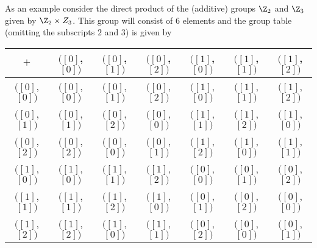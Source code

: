 As an example consider the direct product of the (additive) groups $\Z_{2}$ and $\Z_{3}$ 
given by $\Z_{2} \times Z_{3}$. This group will consist of $6$ elements and the group table
(omitting the subscripts $2$ and $3$) is given
by

\begin{tabular}{ccccccc}
\toprule
$+$    & $(\left[0\right]$,$\left[0\right])$ & $(\left[0\right]$,$\left[1\right])$ 
& $(\left[0\right]$,$\left[2\right])$ & $(\left[1\right]$,$\left[0\right])$
& $(\left[1\right]$,$\left[1\right])$ & $(\left[1\right]$,$\left[2\right])$\\
\midrule
$(\left[0\right]$,$\left[0\right])$   & $(\left[0\right]$,$\left[0\right])$   
& $(\left[0\right]$,$\left[1\right])$ & $(\left[0\right]$,$\left[2\right])$  
& $(\left[1\right]$,$\left[0\right])$
& $(\left[1\right]$,$\left[1\right])$ & $(\left[1\right]$,$\left[2\right])$ \\

$(\left[0\right]$,$\left[1\right])$   & $(\left[0\right]$,$\left[1\right])$   
& $(\left[0\right]$,$\left[2\right])$ & $(\left[0\right]$,$\left[0\right])$  
& $(\left[1\right]$,$\left[1\right])$
& $(\left[1\right]$,$\left[2\right])$ & $(\left[1\right]$,$\left[0\right])$ \\

$(\left[0\right]$,$\left[2\right])$   & $(\left[0\right]$,$\left[2\right])$   
& $(\left[0\right]$,$\left[0\right])$ & $(\left[0\right]$,$\left[1\right])$  
& $(\left[1\right]$,$\left[2\right])$
& $(\left[1\right]$,$\left[0\right])$ & $(\left[1\right]$,$\left[1\right])$ \\

$(\left[1\right]$,$\left[0\right])$   & $(\left[1\right]$,$\left[0\right])$   
& $(\left[1\right]$,$\left[1\right])$ & $(\left[1\right]$,$\left[2\right])$  
& $(\left[0\right]$,$\left[0\right])$
& $(\left[0\right]$,$\left[1\right])$ & $(\left[0\right]$,$\left[2\right])$ \\

$(\left[1\right]$,$\left[1\right])$   & $(\left[1\right]$,$\left[1\right])$   
& $(\left[1\right]$,$\left[2\right])$ & $(\left[1\right]$,$\left[0\right])$  
& $(\left[0\right]$,$\left[1\right])$
& $(\left[0\right]$,$\left[2\right])$ & $(\left[0\right]$,$\left[0\right])$ \\

$(\left[1\right]$,$\left[2\right])$   & $(\left[1\right]$,$\left[2\right])$   
& $(\left[1\right]$,$\left[0\right])$ & $(\left[1\right]$,$\left[1\right])$  
& $(\left[0\right]$,$\left[2\right])$
& $(\left[0\right]$,$\left[0\right])$ & $(\left[0\right]$,$\left[1\right])$ \\
\bottomrule
\end{tabular}


